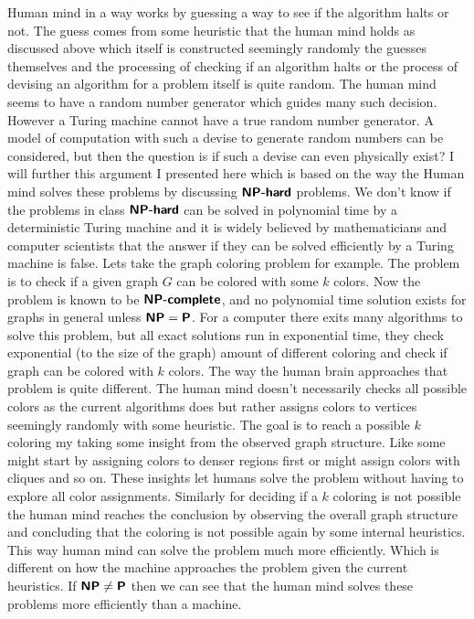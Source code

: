 \documentclass[11pt,a4paper]{article}
\newcommand{\classX}[1]{\ensuremath{\text{\textsf{\textbf{#1}}}}}
\newcommand{\classP}{\classX{P}}
\newcommand{\classNP}{\classX{NP}}
\newcommand{\NPC}{\classX{NP-complete}}
\newcommand{\NPH}{\classX{NP-hard}}
\begin{document}
Human mind in a way works by guessing a way to see if the algorithm halts or not. The guess comes from some heuristic that the human mind holds as discussed above which itself is constructed seemingly randomly the guesses themselves and the processing of checking if an algorithm halts or the process of devising an algorithm for a problem itself is quite random.
The human mind seems to have a random number generator which guides many such decision. However a Turing machine cannot have a true random number generator. A model of computation with such a devise to generate random numbers can be considered, but then the question is if such a devise can even physically exist?
I will further this argument I presented here which is based on the way the Human mind solves these problems by discussing \NPH\; problems.
We don't know if the problems in class $\NPH$ can be solved in polynomial time by a deterministic Turing machine and it is widely believed by mathematicians and computer scientists that the answer if they can be solved efficiently by a Turing machine is false.
Lets take the graph coloring problem for example. The problem is to check if a given graph $G$ can be colored with some $k$ colors. Now the problem is known to be $\NPC$, and no polynomial time solution exists for graphs in general unless $\classNP = \classP$. 
For a computer there exits many algorithms to solve this problem, but all exact solutions run in exponential time, they check exponential (to the size of the graph) amount of different coloring and check if graph can be colored with $k$ colors.
The way the human brain approaches that problem is quite different. The human mind doesn't necessarily checks all possible colors as the current algorithms does but rather assigns colors to vertices seemingly randomly with some heuristic. The goal is to reach a possible $k$ coloring my taking some insight from the observed graph structure. Like some might start by assigning colors to denser regions first or might assign colors with cliques and so on.
These insights let humans solve the problem without having to explore all color assignments. Similarly for deciding if a $k$ coloring is not possible the human mind reaches the conclusion by observing the overall graph structure and concluding that the coloring is not possible again by some internal heuristics. 
This way human mind can solve the problem much more efficiently. Which is different on how the machine approaches the problem given the current heuristics. If $\classNP \neq \classP$ then we can see that the human mind solves these problems more efficiently than a machine. 
\end{document}
